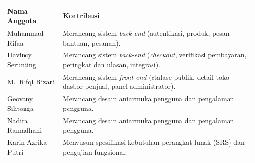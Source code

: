 \documentclass[12pt,a4paper]{article}
\begin{document}
\noindent
\renewcommand{\arraystretch}{1.16}
\begin{tabularx}{\textwidth}{|L{4.1cm}|Y|}
\hline
{}
\textbf{Nama Anggota} & \textbf{Kontribusi} \\
\hline
Muhammad Rifaa & Merancang sistem \textit{back-end} (autentikasi, produk, pesan bantuan, pesanan). \\
\hline
Davincy Serunting & Merancang sistem \textit{back-end} (\textit{checkout}, verifikasi pembayaran, peringkat dan ulasan, integrasi). \\
\hline
M.~Rifqi Rizani & Merancang sistem \textit{front-end} (etalase publik, detail toko, dasbor penjual, panel administrator). \\
\hline
Geovany Silitonga & Merancang desain antarmuka pengguna dan pengalaman pengguna. \\
\hline
Nadira Ramadhani & Merancang desain antarmuka pengguna dan pengalaman pengguna. \\
\hline
Karin Azrika Putri & Menyusun spesifikasi kebutuhan perangkat lunak (SRS) dan pengujian fungsional. \\
\hline
\end{tabularx}

\clearpage




\end{document}
